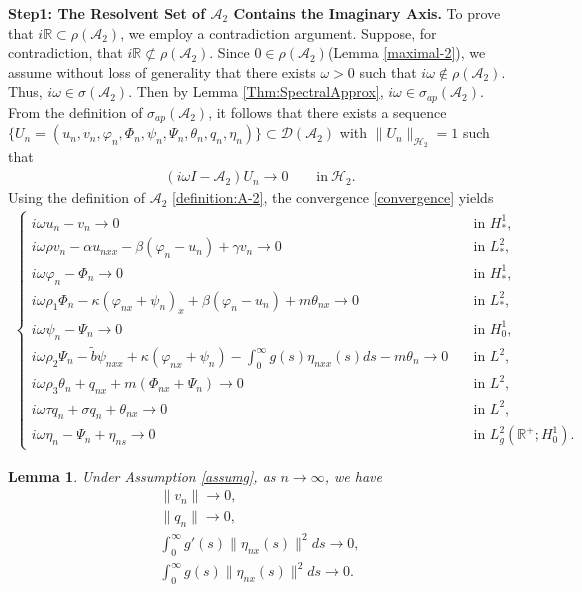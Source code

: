 \documentclass[11pt,reqno]{article}
\newtheorem{lemma}[theorem]{Lemma}
\newcommand{\dt}{\tilde}
\begin{document}
\textbf{Step1: The Resolvent Set of $\mathcal{A}_2$ Contains the Imaginary Axis.}
To prove that $i\mathbb{R} \subset \rho(\mathcal{A}_2)$, we employ a contradiction argument. Suppose, for contradiction, that $i\mathbb{R} \not\subset \rho(\mathcal{A}_2)$. Since $0 \in \rho(\mathcal{A}_2)$(Lemma \ref{maximal-2}), we assume without loss of generality that there exists $\omega > 0$ such that $i\omega \notin \rho(\mathcal{A}_2)$. Thus, $i\omega \in \sigma(\mathcal{A}_2)$. Then by Lemma \ref{Thm:SpectralApprox}, $i\omega \in \sigma_{ap}(\mathcal{A}_2)$. From the definition of $\sigma_{ap}(\mathcal{A}_2)$, it follows that
there exists a sequence $\{U_n=(u_n, v_n, \varphi_n, \Phi_n, \psi_n, \Psi_n, \theta_n, q_n, \eta_n) \} \subset \mathcal{D}(\mathcal{A}_2)$ with $\|U_n\|_{\mathcal{H}_2} = 1$ such that
\begin{align}\label{convergence}
	(i\omega I - \mathcal{A}_2)U_n \to 0 ~~~~~~~~~\text{in} ~\mathcal{H}_2.
\end{align}
Using the definition of $\mathcal{A}_2$ \eqref{definition:A-2}, the convergence \eqref{convergence} yields
\begin{align}\label{omega-limit-system}
	\begin{cases}
		i\omega u_n - v_n  \to 0 \quad &\text{in } H_*^1,\\
		i\omega \rho v_n -\alpha u_{nxx}-\beta(\varphi_n - u_n)+ \gamma v_n \to 0 \quad &\text{in } L_*^2,\\
		i\omega\varphi_n - \Phi_n \to 0\quad &\text{in } H_*^1,\\
		i\omega\rho_1 \Phi_n - \kappa(\varphi_{nx}+\psi_n)_x + \beta (\varphi_n - u_n) +  m\theta_{nx} \to 0 \quad &\text{in } L_*^2,\\
		i\omega \psi_n - \Psi_n \to 0 \quad &\text{in } H_0^1,\\
		i\omega \rho_2 \Psi_n - \dt b \psi_{nxx} + \kappa(\varphi_{nx} + \psi_n) - \int_{0}^{\infty} g(s) \eta_{nxx}(s) ds - m\theta_n \to 0 \quad &\text{in } L^2,\\
		i\omega \rho_3 \theta_n + q_{nx} + m(\Phi_{nx} + \Psi_n) \to 0 \quad &\text{in } L^2,\\
		i\omega\tau q_n + \sigma q_n + \theta_{nx} \to 0 \quad &\text{in } L^2,\\
		i\omega \eta_n - \Psi_n + \eta_{ns} \to 0\quad &\text{in } L_g^2(\mathbb{R}^+;H_0^1).
	\end{cases}
\end{align}
\begin{lemma}\label{iR:vn,qn,etan}
	Under Assumption \ref{assumg}, as $n \to \infty$, we have
	\begin{align}
		\|v_n\| \to 0,\label{limit:vn}\\
		\|q_n\| \to 0,\label{limit:qn}\\
		\int_{0}^{\infty} g'(s)\|\eta_{nx}(s)\|^2ds \to 0,\label{limit:g'}\\
		\int_{0}^{\infty} g(s)\|\eta_{nx}(s)\|^2ds \to 0.\label{limit:g}
	\end{align}
\end{lemma}
\end{document}
